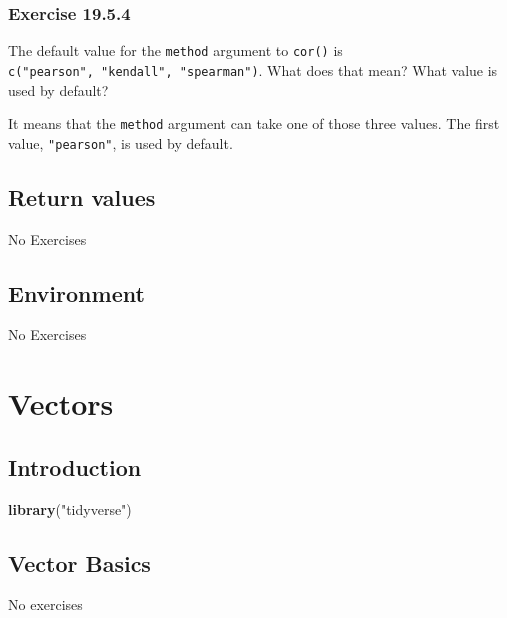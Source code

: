 \documentclass[]{book}
\newenvironment{Shaded}{\begin{snugshade}}{\end{snugshade}}
\newcommand{\KeywordTok}[1]{\textcolor[rgb]{0.13,0.29,0.53}{\textbf{#1}}}
\newcommand{\NormalTok}[1]{#1}
\newcommand{\StringTok}[1]{\textcolor[rgb]{0.31,0.60,0.02}{#1}}
\theoremstyle{plain}
\theoremstyle{remark}
\begin{document}
\hypertarget{exercise-19.5.4}{%
\subsection*{\texorpdfstring{Exercise
{19.5.4}}{Exercise 19.5.4}}\label{exercise-19.5.4}}

The default value for the \texttt{method} argument to \texttt{cor()} is
\texttt{c("pearson",\ "kendall",\ "spearman")}. What does that mean?
What value is used by default?

It means that the \texttt{method} argument can take one of those three
values. The first value, \texttt{"pearson"}, is used by default.

\hypertarget{return-values}{%
\section{Return values}\label{return-values}}

No Exercises

\hypertarget{environment}{%
\section{Environment}\label{environment}}

No Exercises

\hypertarget{vectors}{%
\chapter{Vectors}\label{vectors}}

\hypertarget{introduction-13}{%
\section{Introduction}\label{introduction-13}}

\begin{Shaded}
\begin{Highlighting}[]
\KeywordTok{library}\NormalTok{(}\StringTok{"tidyverse"}\NormalTok{)}
\end{Highlighting}
\end{Shaded}

\hypertarget{vector-basics}{%
\section{Vector Basics}\label{vector-basics}}

No exercises
\end{document}
